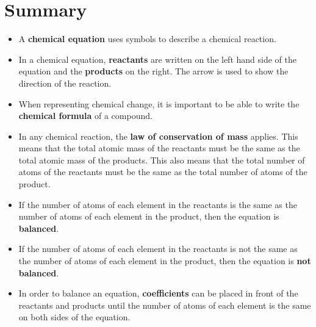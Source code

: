             \section{Summary}
            \nopagebreak
      \label{m38727*id67171}\begin{itemize}[noitemsep]
            \label{m38727*uid36}\item A \textbf{chemical equation} uses symbols to describe a chemical reaction.
\label{m38727*uid37}\item In a chemical equation, \textbf{reactants} are written on the left hand side of the equation and the \textbf{products} on the right. The arrow is used to show the direction of the reaction.
\label{m38727*uid38}\item When representing chemical change, it is important to be able to write the \textbf{chemical formula} of a compound.
\label{m38727*uid39}\item In any chemical reaction, the \textbf{law of conservation of mass} applies. This means that the total atomic mass of the reactants must be the same as the total atomic mass of the products. This also means that the total number of atoms of the reactants must be the same as the total number of atoms of the product.
\label{m38727*uid40}\item If the number of atoms of each element in the reactants is the same as the number of atoms of each element in the product, then the equation is \textbf{balanced}.
\label{m38727*uid41}\item If the number of atoms of each element in the reactants is not the same as the number of atoms of each element in the product, then the equation is \textbf{not balanced}.
\label{m38727*uid42}\item In order to balance an equation, \textbf{coefficients} can be placed in front of the reactants and products until the number of atoms of each element is the same on both sides of the equation.
\end{itemize}
\label{m38727*secfhsst!!!underscore!!!id1434}
